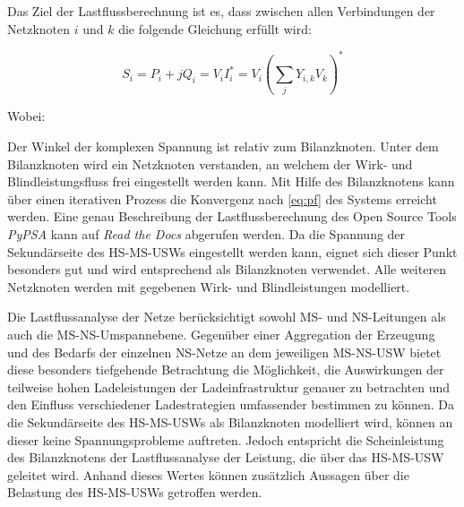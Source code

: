 Das Ziel der Lastflussberechnung ist es, dass zwischen allen Verbindungen der Netzknoten $i$ und $k$ die folgende Gleichung erfüllt wird:

\begin{equation}
	S_i = P_i + j Q_i = V_i I_i^* = V_i \left(\sum_j Y_{i,k} V_k \right)^*
	\label{eq:pf}
\end{equation}

\noindent Wobei:


Der Winkel der komplexen Spannung ist relativ zum Bilanzknoten.
Unter dem Bilanzknoten wird ein Netzknoten verstanden, an welchem der Wirk- und Blindleistungsfluss frei eingestellt werden kann.
Mit Hilfe des Bilanzknotens kann über einen iterativen Prozess die Konvergenz nach \autoref{eq:pf} des Systems erreicht werden.
Eine genau Beschreibung der Lastflussberechnung des Open Source Tools \textit{PyPSA} kann auf \textit{Read the Docs} \cite{Brown2020a} abgerufen werden.
Da die Spannung der Sekundärseite des \gls{HS}-\gls{MS}-\glspl{USW} eingestellt werden kann, eignet sich dieser Punkt besonders gut und wird entsprechend als Bilanzknoten verwendet.
Alle weiteren Netzknoten werden mit gegebenen Wirk- und Blindleistungen modelliert. \cite{Schachler}\medskip

Die Lastflussanalyse der Netze berücksichtigt sowohl \gls{MS}- und \gls{NS}-Leitungen als auch die \gls{MS}-\gls{NS}-Umspannebene.
Gegenüber einer Aggregation der Erzeugung und des Bedarfs der einzelnen \gls{NS}-Netze an dem jeweiligen \gls{MS}-\gls{NS}-\gls{USW} bietet diese besonders tiefgehende Betrachtung die Möglichkeit, die Auswirkungen der teilweise hohen Ladeleistungen der Ladeinfrastruktur genauer zu betrachten und den Einfluss verschiedener Ladestrategien umfassender bestimmen zu können.
Da die Sekundärseite des \gls{HS}-\gls{MS}-\glspl{USW} als Bilanzknoten modelliert wird, können an dieser keine Spannungsprobleme auftreten.
Jedoch entspricht die Scheinleistung des Bilanzknotens der Lastflussanalyse der Leistung, die über das \gls{HS}-\gls{MS}-\gls{USW} geleitet wird.
Anhand dieses Wertes können zusätzlich Aussagen über die Belastung des \gls{HS}-\gls{MS}-\glspl{USW} getroffen werden. \cite{Schachler}\medskip

